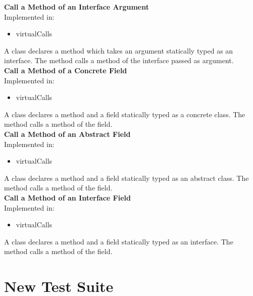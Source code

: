 \documentclass{article}
\begin{document}
\noindent
\textbf{Call a Method of an Interface Argument}\\
Implemented in: 
\begin{itemize}
    \item virtualCalls
\end{itemize}
A class declares a method which takes an argument statically typed as an interface. The method calls a method of the interface passed as argument.\\

\noindent
\textbf{Call a Method of a Concrete Field}\\
Implemented in: 
\begin{itemize}
    \item virtualCalls
\end{itemize}
A class declares a method and a field statically typed as a concrete class. The method calls a method of the field.\\

\noindent
\textbf{Call a Method of an Abstract Field}\\
Implemented in: 
\begin{itemize}
    \item virtualCalls
\end{itemize}
A class declares a method and a field statically typed as an abstract class. The method calls a method of the field.\\

\noindent
\textbf{Call a Method of an Interface Field}\\
Implemented in: 
\begin{itemize}
    \item virtualCalls
\end{itemize}
A class declares a method and a field statically typed as an interface. The method calls a method of the field.\\

\section{New Test Suite}
\end{document}
